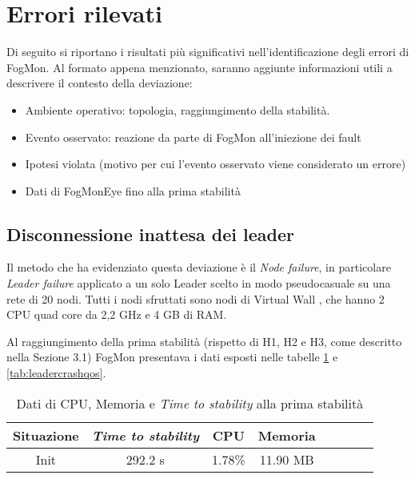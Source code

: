     \section{Errori rilevati}
    Di seguito si riportano i risultati più significativi nell'identificazione degli errori di FogMon. Al formato appena menzionato, saranno aggiunte informazioni utili a descrivere il contesto della deviazione:
    \begin{itemize}
        \item Ambiente operativo: topologia, raggiungimento della stabilità.
        \item Evento osservato: reazione da parte di FogMon all'iniezione dei fault
        \item Ipotesi violata (motivo per cui l'evento osservato viene considerato un errore)
        \item Dati di FogMonEye fino alla prima stabilità
    \end{itemize}
        \subsection{Disconnessione inattesa dei leader}
        Il metodo che ha evidenziato questa deviazione è il \textit{Node failure}, in particolare \textit{Leader failure} applicato a un solo Leader scelto in modo pseudocasuale su una rete di 20 nodi. Tutti i nodi sfruttati sono nodi di Virtual Wall \cite{pcgen2}, che hanno 2 CPU quad core da 2,2 GHz e 4 GB di RAM.
        
        Al raggiungimento della prima stabilità (rispetto di H1, H2 e H3, come descritto nella Sezione 3.1) FogMon presentava i dati esposti nelle tabelle \ref{tab:leadercrash} e \ref{tab:leadercrashqos}.
        
        \begin{table}[H]
            \begin{center}
            \caption{Dati di CPU, Memoria e \textit{Time to stability} alla prima stabilità}
            \label{tab:leadercrash}
                \begin{tabular}{|c|c|c|c|c|c|c|c|}
                    \hline
                    Situazione & \textit{Time to stability} & CPU & Memoria\\
                    \hline
                    Init & 292.2 s & 1.78\% & 11.90 MB\\
                    \hline
                \end{tabular}
            \end{center}
        \end{table}
        
